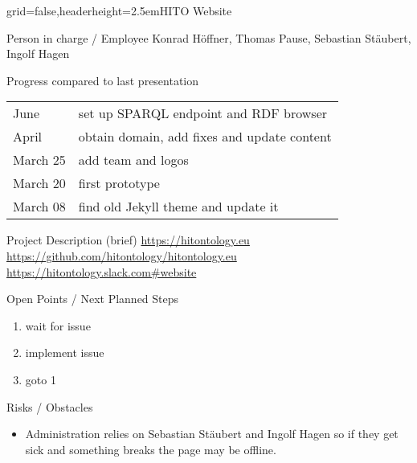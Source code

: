 \documentclass[english]{kiesgrube}
\begin{document}
\begin{poster}{grid=false,headerheight=2.5em}{}{HITO Website}{}{}
\begin{posterbox}[name=person,column=0,row=0]{Person in charge / Employee}
Konrad Höffner, Thomas Pause, Sebastian Stäubert, Ingolf Hagen
\end{posterbox}
\begin{posterbox}[name=progress,below=person]{Progress compared to last presentation}
\begin{tabular}{ll}
June		&set up SPARQL endpoint and RDF browser\\
April 		&obtain domain, add fixes and update content\\
March 25	&add team and logos\\
March 20	&first prototype\\
March 08	&find old Jekyll theme and update it\\
\end{tabular}
\end{posterbox}
\begin{posterbox}[name=description,below=progress]{Project Description (brief)}
\url{https://hitontology.eu}\\
\url{https://github.com/hitontology/hitontology.eu}\\
\url{https://hitontology.slack.com#website}
\end{posterbox}
\begin{posterbox}[name=open,column=1,row=0]{Open Points / Next Planned Steps}
\begin{enumerate}
\item wait for issue
\item implement issue
\item goto 1
\end{enumerate}
\end{posterbox}
\begin{posterbox}[name=risks,column=1,below=open]{Risks / Obstacles}
\begin{itemize}
\item Administration relies on Sebastian Stäubert and Ingolf Hagen so if they get sick and something breaks the page may be offline. 

\end{itemize}
\end{posterbox}
\end{poster}
\end{document}
